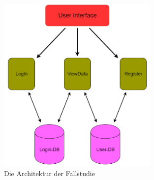 \begin{figure}[bth] 
	\centering
	\includegraphics[width=0.7\textwidth]{Chapters/Bilder/Architektur}
	\caption{Die Architektur der Fallstudie}
	\label{fig:Architektur}
\end{figure}


